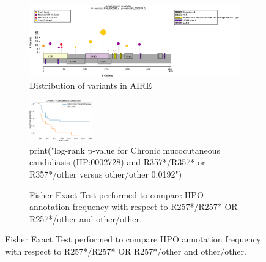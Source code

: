 \begin{figure}[htbp]
\centering
\begin{subfigure}[b]{0.95\textwidth}
\centering
\includegraphics[width=\textwidth]{ img/AIRE_protein_diagram.pdf} 
\captionsetup{justification=raggedright,singlelinecheck=false}
\caption{Distribution of variants in AIRE}
\end{subfigure}

\vspace{2em}

\begin{subfigure}[b]{0.95\textwidth}
\centering
\includegraphics[width=0.3\textwidth]{ img/AIRE_cmc.pdf} 
\captionsetup{justification=raggedright,singlelinecheck=false}
\caption{print("log-rank p-value for Chronic mucocutaneous candidiasis (HP:0002728) and R357*/R357* or R357*/other versus other/other 0.0192")}
\end{subfigure}
    
\vspace{2em}

\begin{subfigure}[b]{0.95\textwidth}
\centering
{}
\captionsetup{justification=raggedright,singlelinecheck=false}
\caption{Fisher Exact Test performed to compare HPO annotation frequency with respect to R257*/R257* OR R257*/other and other/other. }
\end{subfigure}


\end{figure}
